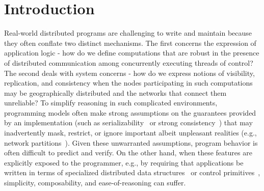 \section{Introduction}
\label{sec:intro}

Real-world distributed programs are challenging to write and maintain
because they often conflate two distinct mechanisms.  The first
concerns the expression of application logic - how do we define
computations that are robust in the presence of distributed
communication among concurrently executing threads of control?  The
second deals with system concerns - how do we express notions of
visibility, replication, and consistency when the nodes participating
in such computations may be geographically distributed and the
networks that connect them unreliable?  To simplify reasoning in such
complicated environments, programming models often make strong
assumptions on the guarantees provided by an implementation (such as
serializability~\cite{Serializability} or strong
consistency~\cite{CDE+12,DNN+15}) that may inadvertently mask,
restrict, or ignore important albeit unpleasant realities (e.g.,
network partitions~\cite{Brewer2000,Gilbert2002}). Given these
unwarranted assumptions, program behavior is often difficult to
predict and verify.  On the other hand, when these features are
explicitly exposed to the programmer, e.g., by requiring that
applications be written in terms of specialized distributed data
structures~\cite{Burckhardt2014,BFL+12,SPB+11} or control
primitives~\cite{Calm}, simplicity, composability, and
ease-of-reasoning can suffer.

